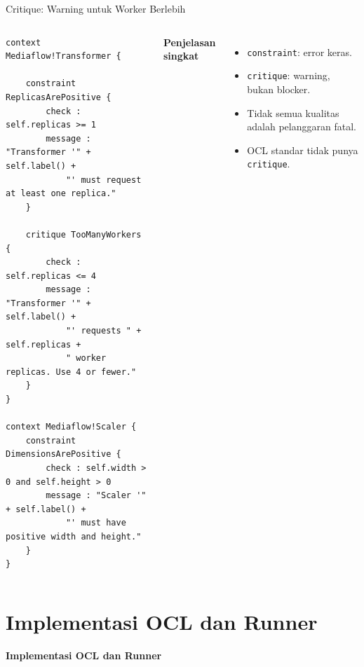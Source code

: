 \documentclass[aspectratio=169, table]{beamer}
\begin{document}
\begin{frame}[fragile]{Critique: Warning untuk Worker Berlebih}
\vspace{14pt}
\begin{columns}[T,onlytextwidth]
\begin{lstlisting}[language=eol, basicstyle=\ttfamily\tiny]
context Mediaflow!Transformer {

    constraint ReplicasArePositive {
        check : self.replicas >= 1
        message : "Transformer '" + self.label() +
            "' must request at least one replica."
    }

    critique TooManyWorkers {
        check : self.replicas <= 4
        message : "Transformer '" + self.label() +
            "' requests " + self.replicas +
            " worker replicas. Use 4 or fewer."
    }
}

context Mediaflow!Scaler {
    constraint DimensionsArePositive {
        check : self.width > 0 and self.height > 0
        message : "Scaler '" + self.label() +
            "' must have positive width and height."
    }
}
\end{lstlisting}

\scriptsize
\textbf{Penjelasan singkat}
\begin{itemize}
  \item \texttt{constraint}: error keras.
  \item \texttt{critique}: warning, bukan blocker.
  \item Tidak semua kualitas adalah pelanggaran fatal.
  \item OCL standar tidak punya \texttt{critique}.
\end{itemize}
\end{columns}
\end{frame}

\section{Implementasi OCL dan Runner}
\begin{frame}{\hfill}
	\centering
	\Huge{\textbf{Implementasi OCL dan Runner}}
\end{frame}
\end{document}
